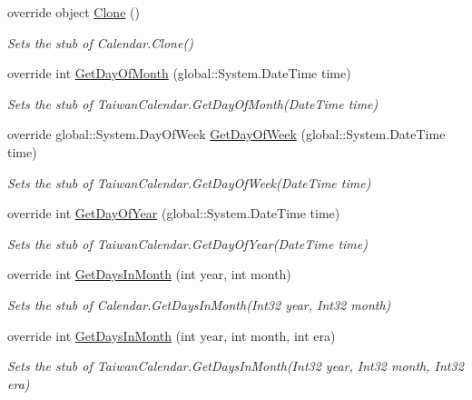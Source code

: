 \begin{DoxyCompactItemize}
override object \hyperlink{class_system_1_1_globalization_1_1_fakes_1_1_stub_taiwan_calendar_a7113f8cc316f6f1e169a063ee0a7555f}{Clone} ()
\begin{DoxyCompactList}\small\item\em Sets the stub of Calendar.\-Clone()\end{DoxyCompactList}\item 
override int \hyperlink{class_system_1_1_globalization_1_1_fakes_1_1_stub_taiwan_calendar_ac889f07654675d7c50be5be89e1bbbd9}{Get\-Day\-Of\-Month} (global\-::\-System.\-Date\-Time time)
\begin{DoxyCompactList}\small\item\em Sets the stub of Taiwan\-Calendar.\-Get\-Day\-Of\-Month(\-Date\-Time time)\end{DoxyCompactList}\item 
override global\-::\-System.\-Day\-Of\-Week \hyperlink{class_system_1_1_globalization_1_1_fakes_1_1_stub_taiwan_calendar_af7322e988e93a7f8daa6b4c777ce8f6e}{Get\-Day\-Of\-Week} (global\-::\-System.\-Date\-Time time)
\begin{DoxyCompactList}\small\item\em Sets the stub of Taiwan\-Calendar.\-Get\-Day\-Of\-Week(\-Date\-Time time)\end{DoxyCompactList}\item 
override int \hyperlink{class_system_1_1_globalization_1_1_fakes_1_1_stub_taiwan_calendar_ab8c8eb18628518b070cd6822e02a7f9c}{Get\-Day\-Of\-Year} (global\-::\-System.\-Date\-Time time)
\begin{DoxyCompactList}\small\item\em Sets the stub of Taiwan\-Calendar.\-Get\-Day\-Of\-Year(\-Date\-Time time)\end{DoxyCompactList}\item 
override int \hyperlink{class_system_1_1_globalization_1_1_fakes_1_1_stub_taiwan_calendar_a56b7d2f0822fd373e64c5d759f81c487}{Get\-Days\-In\-Month} (int year, int month)
\begin{DoxyCompactList}\small\item\em Sets the stub of Calendar.\-Get\-Days\-In\-Month(\-Int32 year, Int32 month)\end{DoxyCompactList}\item 
override int \hyperlink{class_system_1_1_globalization_1_1_fakes_1_1_stub_taiwan_calendar_a879790403dc668564634bd20756e4346}{Get\-Days\-In\-Month} (int year, int month, int era)
\begin{DoxyCompactList}\small\item\em Sets the stub of Taiwan\-Calendar.\-Get\-Days\-In\-Month(\-Int32 year, Int32 month, Int32 era)\end{DoxyCompactList}\item 

\end{DoxyCompactItemize}
